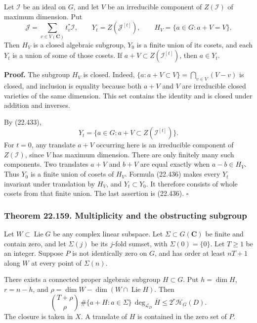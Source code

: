 \documentclass[
  11pt,
  a4paper,
]{article}
\begin{document}
Let \(\mathcal I\) be an ideal on \(G\), and let \(V\) be an irreducible
component of \(Z(\mathcal I)\) of maximum dimension. Put \[
 \mathcal J=\sum_{v\in V(\mathbf C)}t_v^*\mathcal I,
 \qquad
 Y_t=Z(\mathcal J^{[t]}),\qquad
 H_V=\{a\in G:a+V=V\}.
 \tag{22.435}
\] Then \(H_V\) is a closed algebraic subgroup, \(Y_0\) is a finite
union of its cosets, and each \(Y_t\) is a union of some of those
cosets. If \(a+V\subset Z(\mathcal I^{[t]})\), then \(a\in Y_t\).

\textbf{Proof.} The subgroup \(H_V\) is closed. Indeed,
\(\{a:a+V\subset V\}=\bigcap_{v\in V}(V-v)\) is closed, and inclusion is
equality because both \(a+V\) and \(V\) are irreducible closed varieties
of the same dimension. This set contains the identity and is closed
under addition and inverses.

By (22.433), \[
 Y_t=\{a\in G:a+V\subset Z(\mathcal I^{[t]})\}.
 \tag{22.436}
\] For \(t=0\), any translate \(a+V\) occurring here is an irreducible
component of \(Z(\mathcal I)\), since \(V\) has maximum dimension. There
are only finitely many such components. Two translates \(a+V\) and
\(b+V\) are equal exactly when \(a-b\in H_V\). Thus \(Y_0\) is a finite
union of cosets of \(H_V\). Formula (22.436) makes every \(Y_t\)
invariant under translation by \(H_V\), and \(Y_t\subset Y_0\). It
therefore consists of whole cosets from that finite union. The last
assertion is (22.436). \(\square\)

\subsubsection{Theorem 22.159. Multiplicity and the obstructing
subgroup}\label{theorem-22.159.-multiplicity-and-the-obstructing-subgroup}

Let \(W\subset\operatorname{Lie}G\) be any complex linear subspace. Let
\(\Sigma\subset G(\mathbf C)\) be finite and contain zero, and let
\(\Sigma(j)\) be its \(j\)-fold sumset, with \(\Sigma(0)=\{0\}\). Let
\(T\ge1\) be an integer. Suppose \(P\) is not identically zero on \(G\),
and has order at least \(nT+1\) along \(W\) at every point of
\(\Sigma(n)\).

There exists a connected proper algebraic subgroup \(H\subset G\). Put
\(h=\dim H\), \(r=n-h\), and
\(\rho=\dim W-\dim(W\cap\operatorname{Lie}H)\). Then \[
 \binom{T+\rho}{\rho}\,
     \#\{a+H:a\in\Sigma\}\,
     \deg_{\mathcal L_D}\overline H
       \le 2^r\mathcal H_G(D).
 \tag{22.437}
\] The closure is taken in \(X\). A translate of \(H\) is contained in
the zero set of \(P\).
\end{document}
